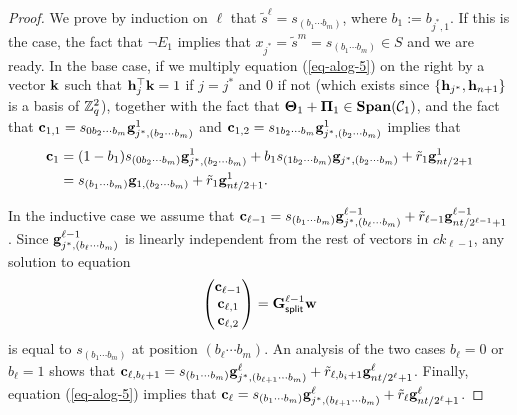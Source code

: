\begin{proof}
We prove by induction on \(\ell\) that \(\tilde{s}^\ell=s_{(b_1\cdots b_m)}\), where \(b_1:=b_{j^*,1}\). If this is the case, the fact that \(\neg E_1\) implies that \(x_{j^*}=\tilde{s}^m=s_{(b_1\cdots b_m)}\in S\) and we are ready. In the base case, if we multiply equation (\ref{eq-alog-5}) on the right by a vector \(\mathbf{k}\) such that \(\mathbf{h}_j^\top\mathbf{k}=1\) if \(j=j^*\) and \(0\) if not (which exists since \(\{\mathbf{h}_{j^*},\mathbf{h}_{n+1}\}\) is a basis of \(\mathbb{Z}_q^2\)), together with the fact that \(\mathbf{{\Theta}}_1+\mathbf{{\Pi}}_1\in\mathbf{Span}(\mathcal{C}_1)\), and the fact that \(\mathbf{c}_{1,1}=s_{0b_{2}\cdots b_{m}} \mathbf{g}_{j^*,(b_{2}\cdots b_{m})}^1\) and \(\mathbf{c}_{1,2}=s_{1b_{2}\cdots b_{m}}\mathbf{g}_{j^*,(b_{2}\cdots b_{m})}^1\) implies that 
\begin{align*}
\mathbf{c}_1 &= (1-b_{1})s_{(0b_{2}\cdots b_{m})} \mathbf{g}_{j^*,(b_{2}\cdots b_{m})}^1+b_{1}s_{(1b_{2}\cdots b_{m})}\mathbf{g}_{j^*,(b_{2}\cdots b_{m})}+\tilde{r}_1\mathbf{g}_{nt /2+1}^1\\
&=s_{(b_{1}\cdots b_{m})}\mathbf{g}_{1,(b_{2}\cdots b_{m})}+\tilde{r}_1\mathbf{g}_{nt /2+1}^1.
\end{align*}

In the inductive case we assume that \(\mathbf{c}_{\ell-1}=s_{(b_1\cdots b_m)}\mathbf{g}_{j^*,(b_\ell\cdots b_m)}^{\ell-1}+\tilde{r}_{\ell-1}\mathbf{g}_{nt /2^{\ell-1}+1}^{\ell-1}\). Since \(\mathbf{g}_{j^*,(b_\ell\cdots b_m)}^{\ell-1}\) is linearly independent from the rest of vectors in \(ck_{\ell-1}\), any solution to equation
\[
\begin{pmatrix}\mathbf{c}_{\ell-1}\\\mathbf{c}_{\ell,1}\\\mathbf{c}_{\ell,2}\end{pmatrix}=\mathbf{{G}}^{\ell-1}_{\mathsf{split}}\mathbf{w}
\]
 is equal to \(s_{(b_1\cdots b_m)}\) at position \((b_\ell \cdots b_m)\). An analysis of the two cases \(b_\ell=0\) or \(b_\ell=1\) shows that \(\mathbf{c}_{\ell,b_\ell+1}=s_{(b_1\cdots b_m)}\mathbf{g}_{j^*,(b_{\ell+1}\cdots b_m)}^\ell+\tilde{r}_{\ell,b_i+1}\mathbf{g}_{nt /2^\ell+1}^\ell\). Finally, equation (\ref{eq-alog-5}) implies that \(\mathbf{c}_\ell=s_{(b_1\cdots b_m)}\mathbf{g}_{j^*,(b_{\ell+1}\cdots b_m)}^\ell+\tilde{r}_\ell\mathbf{g}_{nt /2^\ell+1}^\ell\).
\end{proof}

